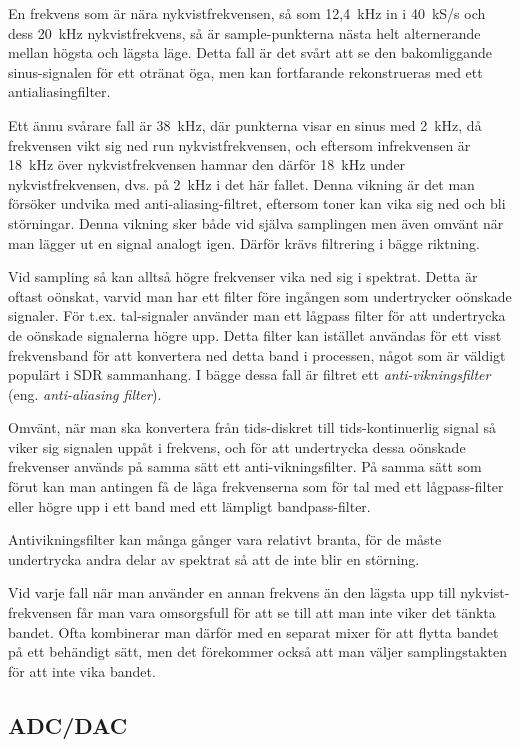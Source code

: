 En frekvens som är nära nykvistfrekvensen, så som 12,4~kHz in i 40~kS/s och
dess 20~kHz nykvistfrekvens, så är sample-punkterna nästa helt alternerande
mellan högsta och lägsta läge. Detta fall är det svårt att se den bakomliggande
sinus-signalen för ett otränat öga, men kan fortfarande rekonstrueras med ett
antialiasingfilter.

Ett ännu svårare fall är 38~kHz, där punkterna visar en sinus med 2~kHz, då
frekvensen vikt sig ned run nykvistfrekvensen, och eftersom infrekvensen är
18~kHz över nykvistfrekvensen hamnar den därför 18~kHz under nykvistfrekvensen,
dvs. på 2~kHz i det här fallet. Denna vikning är det man försöker undvika med
anti-aliasing-filtret, eftersom toner kan vika sig ned och bli störningar.
Denna vikning sker både vid själva samplingen men även omvänt när man lägger ut
en signal analogt igen. Därför krävs filtrering i bägge riktning.

Vid sampling så kan alltså högre frekvenser vika ned sig i spektrat.
Detta är oftast oönskat, varvid man har ett filter före ingången som
undertrycker oönskade signaler.
För t.ex. tal-signaler använder man ett lågpass filter för att undertrycka de
oönskade signalerna högre upp.
Detta filter kan istället användas för ett visst frekvensband för att
konvertera ned detta band i processen, något som är väldigt populärt i SDR
sammanhang.
I bägge dessa fall är filtret ett \emph{anti-vikningsfilter} (eng.
\emph{anti-aliasing filter}).

Omvänt, när man ska konvertera från tids-diskret till tids-kontinuerlig
signal så viker sig signalen uppåt i frekvens, och för att undertrycka dessa
oönskade frekvenser används på samma sätt ett anti-vikningsfilter.
På samma sätt som förut kan man antingen få de låga frekvenserna som för tal
med ett lågpass-filter eller högre upp i ett band med ett lämpligt
bandpass-filter.

Antivikningsfilter kan många gånger vara relativt branta, för de måste
undertrycka andra delar av spektrat så att de inte blir en störning.

Vid varje fall när man använder en annan frekvens än den lägsta upp till
nykvist-frekvensen får man vara omsorgsfull för att se till att man inte viker
det tänkta bandet.
Ofta kombinerar man därför med en separat mixer för att flytta bandet på ett
behändigt sätt, men det förekommer också att man väljer samplingstakten för att
inte vika bandet.

\subsection{ADC/DAC}

